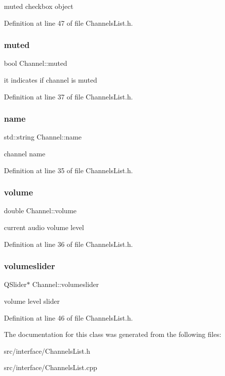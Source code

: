 muted checkbox object 

Definition at line 47 of file Channels\+List.\+h.

\mbox{\label{class_channel_ada7e3a050c346ad283ad302745f03f3c}} 
\subsubsection{\texorpdfstring{muted}{muted}}
{\footnotesize\ttfamily bool Channel\+::muted}

it indicates if channel is muted 

Definition at line 37 of file Channels\+List.\+h.

\mbox{\label{class_channel_ae080e1afd52f3b70e04c62fea46447aa}} 
\subsubsection{\texorpdfstring{name}{name}}
{\footnotesize\ttfamily std\+::string Channel\+::name}

channel name 

Definition at line 35 of file Channels\+List.\+h.

\mbox{\label{class_channel_aa8977e4605932b2201b03ebf3aa14ffd}} 
\subsubsection{\texorpdfstring{volume}{volume}}
{\footnotesize\ttfamily double Channel\+::volume}

current audio volume level 

Definition at line 36 of file Channels\+List.\+h.

\mbox{\label{class_channel_acbcbfb33558a69224daa176372eb8be3}} 
\subsubsection{\texorpdfstring{volumeslider}{volumeslider}}
{\footnotesize\ttfamily Q\+Slider$\ast$ Channel\+::volumeslider}

volume level slider 

Definition at line 46 of file Channels\+List.\+h.



The documentation for this class was generated from the following files\+:\begin{DoxyCompactItemize}
\item 
src/interface/Channels\+List.\+h\item 
src/interface/Channels\+List.\+cpp\end{DoxyCompactItemize}
